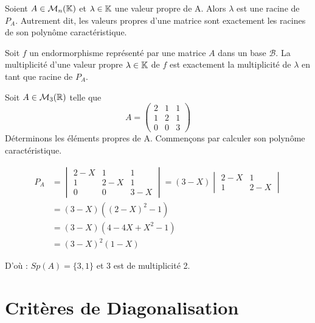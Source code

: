 \begin{prop}
    Soient $A \in \mathcal{M}_n(\mathbb{K})$ et $\lambda \in \mathbb{K}$ une valeur propre de A. 
    Alors $\lambda$ est une racine de $P_A$. 
    Autrement dit, les valeurs propres d'une matrice sont exactement les racines de son polynôme caractéristique. 
\end{prop}

\begin{definition}[Multiplicité]
    Soit $f$ un endormorphisme représenté par une matrice $A$ dans un base $\mathcal{B}$. 
    La multiplicité d'une valeur propre $\lambda \in \mathbb{K}$ de $f$ est exactement la multiplicité de $\lambda$ en tant que racine de $P_A$.     
\end{definition}

\begin{example}
    Soit $A \in \mathcal{M}_3(\mathbb{R})$ telle que 
    \[A = 
        \begin{pmatrix}
            2 & 1 & 1 \\ 
            1 & 2 & 1 \\ 
            0 & 0 & 3
        \end{pmatrix}
    \]
    Déterminons les éléments propres de A. Commençons par calculer son polynôme caractéristique. 

    \begin{align*}
        P_A &=  \begin{vmatrix}
                    2-X & 1 & 1 \\ 
                    1 & 2-X & 1 \\ 
                    0 & 0 & 3-X 
                \end{vmatrix}
            = (3-X)    \begin{vmatrix}
                            2-X & 1  \\ 
                            1 & 2-X
                        \end{vmatrix} \\ 
            &= (3-X)((2-X)^2-1) \\
            &= (3-X)(4 - 4X + X^2 - 1) \\
            &= (3-X)^2(1-X)
    \end{align*}

    D'où : $Sp(A) = \{3,1\}$ et 3 est de multiplicité 2. 
\end{example}


\section{Critères de Diagonalisation}


